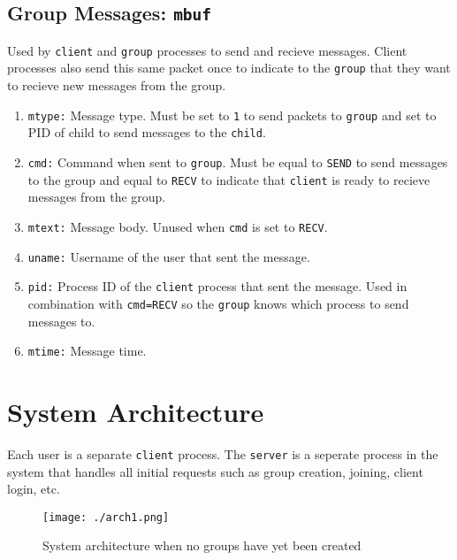 \documentclass{article}
\begin{document}
\subsection{Group Messages: \lstinline{mbuf}}

Used by \lstinline{client} and \lstinline{group} processes to send and recieve messages. Client processes also send this same packet once to indicate to the \lstinline{group} that they want to recieve new messages from the group.
\begin{enumerate}
	\item \lstinline{mtype:} Message type. Must be set to \lstinline{1} to send packets to \lstinline{group} and set to PID of child to send messages to the \lstinline{child}.
	\item \lstinline{cmd:} Command when sent to \lstinline{group}. Must be equal to \lstinline{SEND} to send messages to the group and equal to \lstinline{RECV} to indicate that \lstinline{client} is ready to recieve messages from the group. 
	\item \lstinline{mtext:} Message body. Unused when \lstinline{cmd} is set to \lstinline{RECV}.
	\item \lstinline{uname:} Username of the user that sent the message.
	\item \lstinline{pid:} Process ID of the \lstinline{client} process that sent the message. Used in combination with \lstinline{cmd=RECV} so the \lstinline{group} knows which process to send messages to.
	\item \lstinline{mtime:} Message time.
\end{enumerate} 

\section{System Architecture}
Each user is a separate \lstinline{client} process. The \lstinline{server} is a seperate process in the system that handles all initial requests such as group creation, joining, client login, etc. 
\begin{figure}[H]
	\centering
	\texttt{[image: ./arch1.png]}
	\caption{System architecture when no groups have yet been created}
\end{figure}
\end{document}
